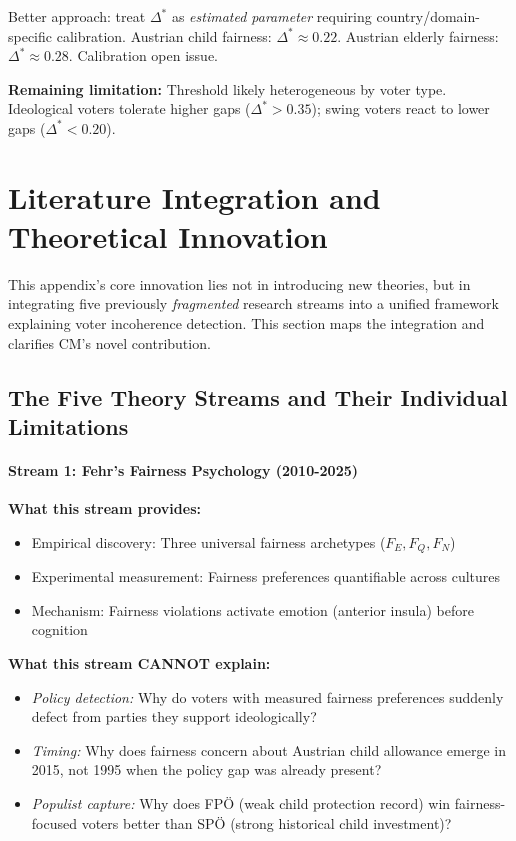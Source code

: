 Better approach: treat $\Delta^*$ as \textit{estimated parameter} requiring country/domain-specific
calibration. Austrian child fairness: $\Delta^* \approx 0.22$. Austrian elderly fairness: $\Delta^* \approx 0.28$.
Calibration open issue.

\textbf{Remaining limitation:} Threshold likely heterogeneous by voter type. Ideological voters
tolerate higher gaps ($\Delta^* > 0.35$); swing voters react to lower gaps ($\Delta^* < 0.20$).

\section{Literature Integration and Theoretical Innovation}
\label{sec:cm-literature-integration}

This appendix's core innovation lies not in introducing new theories, but in integrating
five previously \textit{fragmented} research streams into a unified framework explaining
voter incoherence detection. This section maps the integration and clarifies CM's novel contribution.

\subsection{The Five Theory Streams and Their Individual Limitations}

\paragraph{Stream 1: Fehr's Fairness Psychology (2010-2025)}

\textbf{What this stream provides:}
\begin{itemize}[nosep]
\item Empirical discovery: Three universal fairness archetypes ($F_E, F_Q, F_N$)
\item Experimental measurement: Fairness preferences quantifiable across cultures
\item Mechanism: Fairness violations activate emotion (anterior insula) before cognition
\end{itemize}

\textbf{What this stream CANNOT explain:}
\begin{itemize}[nosep]
\item \textit{Policy detection:} Why do voters with measured fairness preferences suddenly
defect from parties they support ideologically?
\item \textit{Timing:} Why does fairness concern about Austrian child allowance emerge in 2015,
not 1995 when the policy gap was already present?
\item \textit{Populist capture:} Why does FPÖ (weak child protection record) win fairness-focused
voters better than SPÖ (strong historical child investment)?
\end{itemize}

